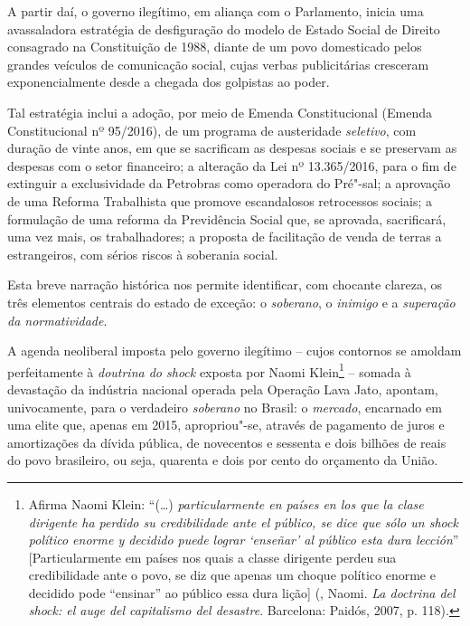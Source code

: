 A partir daí, o governo ilegítimo, em aliança com o Parlamento, inicia
uma avassaladora estratégia de desfiguração do modelo de Estado Social
de Direito consagrado na Constituição de 1988, diante de um povo
domesticado pelos grandes veículos de comunicação social, cujas verbas
publicitárias cresceram exponencialmente desde a chegada dos golpistas
ao poder.

Tal estratégia inclui a adoção, por meio de Emenda Constitucional
(Emenda Constitucional nº 95/2016), de um programa de austeridade
\emph{seletivo}, com duração de vinte anos, em que se sacrificam as
despesas sociais e se preservam as despesas com o setor financeiro; a
alteração da Lei nº 13.365/2016, para o fim de extinguir a exclusividade
da Petrobras como operadora do Pré"-sal; a aprovação de uma Reforma
Trabalhista que promove escandalosos retrocessos sociais; a formulação
de uma reforma da Previdência Social que, se aprovada, sacrificará, uma
vez mais, os trabalhadores; a proposta de facilitação de venda de terras
a estrangeiros, com sérios riscos à soberania social.

Esta breve narração histórica nos permite identificar, com chocante
clareza, os três elementos centrais do estado de exceção: o
\emph{soberano}, o \emph{inimigo} e a \emph{superação da normatividade}.

A agenda neoliberal imposta pelo governo ilegítimo -- cujos contornos se
amoldam perfeitamente à \emph{doutrina do shock} exposta por Naomi
Klein\footnote{Afirma Naomi Klein: ``(\ldots{}) \emph{particularmente en países en
  los que la clase dirigente ha perdido su credibilidade ante el
  público, se dice que sólo un shock político enorme y decidido puede
  lograr `enseñar' al público esta dura lección}'' [Particularmente
  em países nos quais a classe dirigente perdeu sua credibilidade ante
  o povo, se diz que apenas um choque político enorme e decidido pode
  ``ensinar'' ao público essa dura lição] (, Naomi.
  \emph{La doctrina del shock: el auge del capitalismo del desastre}.
  Barcelona: Paidós, 2007, p. 118).} -- somada à devastação da indústria
nacional operada pela Operação Lava Jato, apontam, univocamente, para o
verdadeiro \emph{soberano} no Brasil: o \emph{mercado}, encarnado em uma
elite que, apenas em 2015, apropriou"-se, através de pagamento de juros e
amortizações da dívida pública, de novecentos e sessenta e dois bilhões
de reais do povo brasileiro, ou seja, quarenta e dois por cento do
orçamento da União.

